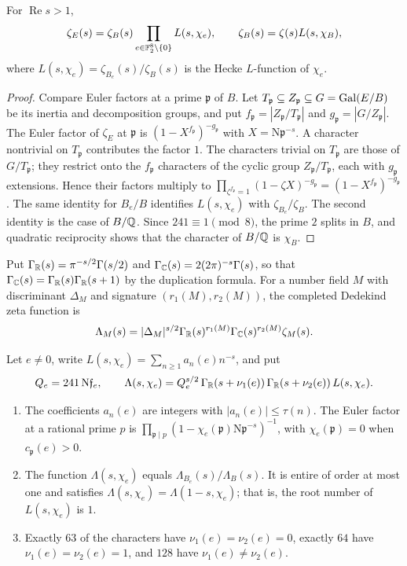 \begin{proposition}\label{gf:factorization}
For $\operatorname{Re}s>1$,
\[
 \zeta_E(s)=\zeta_B(s)\prod_{e\in\mathbb F_2^8\setminus\{0\}}L(s,\chi_e),
 \qquad \zeta_B(s)=\zeta(s)L(s,\chi_B),
\]
where $L(s,\chi_e)=\zeta_{B_e}(s)/\zeta_B(s)$ is the Hecke $L$-function of
$\chi_e$.
\end{proposition}

\begin{proof}
Compare Euler factors at a prime $\mathfrak p$ of $B$. Let $T_{\mathfrak
p}\subseteq Z_{\mathfrak p}\subseteq G=\operatorname{Gal}(E/B)$ be its inertia and
decomposition groups, and put $f_{\mathfrak p}=|Z_{\mathfrak p}/T_{\mathfrak
p}|$ and $g_{\mathfrak p}=|G/Z_{\mathfrak p}|$. The Euler factor of $\zeta_E$
at $\mathfrak p$ is $(1-X^{f_{\mathfrak p}})^{-g_{\mathfrak p}}$ with
$X=\mathrm N\mathfrak p^{-s}$. A character nontrivial on $T_{\mathfrak p}$
contributes the factor $1$. The characters trivial on $T_{\mathfrak p}$ are
those of $G/T_{\mathfrak p}$; they restrict onto the $f_{\mathfrak p}$
characters of the cyclic group $Z_{\mathfrak p}/T_{\mathfrak p}$, each with
$g_{\mathfrak p}$ extensions. Hence their factors multiply to
$\prod_{\zeta^{f_{\mathfrak p}}=1}(1-\zeta X)^{-g_{\mathfrak p}}
=(1-X^{f_{\mathfrak p}})^{-g_{\mathfrak p}}$. The same identity for $B_e/B$
identifies $L(s,\chi_e)$ with $\zeta_{B_e}/\zeta_B$. The second identity is
the case of $B/\mathbb Q$. Since $241\equiv1\pmod8$, the prime $2$ splits in $B$,
and quadratic reciprocity shows that the character of $B/\mathbb Q$ is
$\chi_B$.
\end{proof}

Put $\Gamma_\mathbb R(s)=\pi^{-s/2}\Gamma(s/2)$ and
$\Gamma_\mathbb C(s)=2(2\pi)^{-s}\Gamma(s)$, so that
$\Gamma_\mathbb C(s)=\Gamma_\mathbb R(s)\Gamma_\mathbb R(s+1)$ by the duplication formula. For a
number field $M$ with discriminant $\Delta_M$ and signature
$(r_1(M),r_2(M))$, the completed Dedekind zeta function is
\[
 \Lambda_M(s)=|\Delta_M|^{s/2}\Gamma_\mathbb R(s)^{r_1(M)}\Gamma_\mathbb C(s)^{r_2(M)}
 \zeta_M(s).
\]

\begin{proposition}\label{gf:degree-two}
Let $e\ne0$, write $L(s,\chi_e)=\sum_{n\ge1}a_n(e)n^{-s}$, and put
\[
 Q_e=241\,\mathrm N\mathfrak f_e,\qquad
 \Lambda(s,\chi_e)=Q_e^{s/2}\,\Gamma_\mathbb R(s+\nu_1(e))\,\Gamma_\mathbb R(s+\nu_2(e))\,
 L(s,\chi_e).
\]
\begin{enumerate}
\item The coefficients $a_n(e)$ are integers with $|a_n(e)|\le\tau(n)$. The
 Euler factor at a rational prime $p$ is
 $\prod_{\mathfrak p\mid p}(1-\chi_e(\mathfrak p)\mathrm N\mathfrak p^{-s})^{-1}$,
 with $\chi_e(\mathfrak p)=0$ when $c_{\mathfrak p}(e)>0$.
\item The function $\Lambda(s,\chi_e)$ equals $\Lambda_{B_e}(s)/\Lambda_B(s)$.
 It is entire of order at most one and satisfies
 $\Lambda(s,\chi_e)=\Lambda(1-s,\chi_e)$; that is, the root number of
 $L(s,\chi_e)$ is $1$.
\item Exactly $63$ of the characters have $\nu_1(e)=\nu_2(e)=0$, exactly
 $64$ have $\nu_1(e)=\nu_2(e)=1$, and $128$ have $\nu_1(e)\ne\nu_2(e)$.
\end{enumerate}
\end{proposition}

